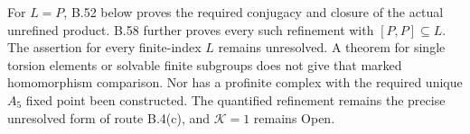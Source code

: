 For $L=P$, B.52 below proves the required conjugacy
and closure of the actual unrefined product.
B.58 further proves every such refinement with $[P,P]\subseteq L$.
The assertion for every finite-index $L$ remains unresolved.
A theorem for single torsion elements or solvable finite
subgroups does not give that marked homomorphism comparison.
Nor has a profinite complex with the required unique
$A_5$ fixed point been constructed.
The quantified refinement remains the precise unresolved
form of route B.4(c), and $\mathcal K=1$ remains Open.
